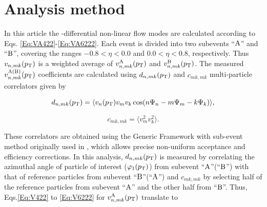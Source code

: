 \section{Analysis method}
\label{Sec:Analysis method}
In this article the \pT-differential non-linear flow modes are calculated according to Eqs. \ref{Eq:VA422}-\ref{Eq:VA6222}. Each event is divided into two subevents ``$\rm{A}$'' and ``$\rm{B}$'', covering the ranges $-0.8< \eta < 0.0$ and $0.0 <\eta< 0.8$, respectively. Thus $v_{n,mk}(p_{\rm{T}})$ is a weighted average of $v_{n,mk}^{\rm{A}}(p_{\rm{T}})$ and $v_{n,mk}^{\rm{B}}(p_{\rm{T}})$. The measured $v_{n,mk}^{\rm{A(B)}}(p_{\rm{T}})$ coefficients are calculated using $d_{n,mk}(p_{\rm{T}})$ and $c_{mk,mk}$ multi-particle correlators given by

\begin{equation}
d_{n,mk}(p_{\rm{T}}) = \langle v_{n}(p_{\rm{T}})v_{m}v_{k}\cos(n\Psi_{n}-m\Psi_{m}-k\Psi_{k}) \rangle,
\label{Eq:dnmki}
\end{equation}


\begin{equation}
c_{mk,mk} = \langle v_{m}^{2}v_{k}^{2}\rangle.
\label{Eq:cmkimki}
\end{equation}

 
These correlators are obtained using the Generic Framework with sub-event method originally used in \cite{Acharya:2017zfg}, which allows precise non-uniform acceptance and efficiency corrections. In this analysis, $d_{n,mk}(p_{\rm{T}})$ is measured by correlating the azimuthal angle of particle of interest ($\varphi_{1}(p_{\rm T})$) from subevent ``$\rm{A}$''(``$\rm{B}$'') with that of reference particles from subevent ``$\rm{B}$''(``$\rm{A}$'') and $c_{mk,mk}$ by selecting half of the reference particles from subevent ``$\rm{A}$'' and the other half from ``$\rm{B}$''. Thus, Eqs.\ref{Eq:V422} to \ref{Eq:V6222} for $v_{n,mk}^{\rm{A}}(p_{\rm{T}})$ translate to

